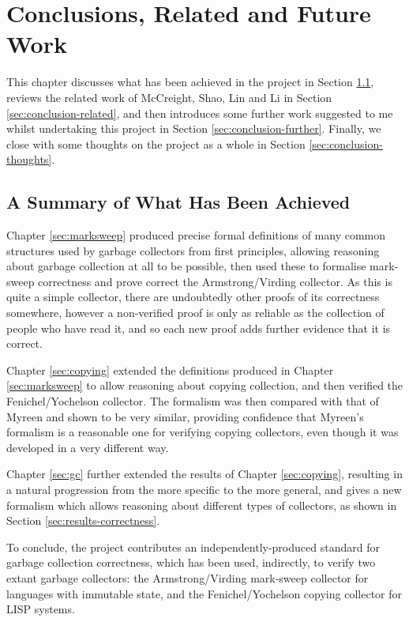 \chapter{Conclusions, Related and Future Work}
\label{sec:conclusion}

This chapter discusses what has been achieved in the project in
Section \ref{sec:conclusion-review}, reviews the related work of
McCreight, Shao, Lin and Li\cite{McCreight07} in Section
\ref{sec:conclusion-related}, and then introduces some further work
suggested to me whilst undertaking this project in Section
\ref{sec:conclusion-further}. Finally, we close with some thoughts on
the project as a whole in Section \ref{sec:conclusion-thoughts}.

\section{A Summary of What Has Been Achieved}
\label{sec:conclusion-review}

Chapter \ref{sec:marksweep} produced precise formal definitions of
many common structures used by garbage collectors from first
principles, allowing reasoning about garbage collection at all to be
possible, then used these to formalise mark-sweep correctness and
prove correct the Armstrong/Virding collector. As this is quite a
simple collector, there are undoubtedly other proofs of its
correctness somewhere, however a non-verified proof is only as
reliable as the collection of people who have read it, and so each new
proof adds further evidence that it is correct.

Chapter \ref{sec:copying} extended the definitions produced in Chapter
\ref{sec:marksweep} to allow reasoning about copying collection, and
then verified the Fenichel/Yochelson collector. The formalism was then
compared with that of Myreen\cite{Myreen10} and shown to be very
similar, providing confidence that Myreen's formalism is a reasonable
one for verifying copying collectors, even though it was developed in
a very different way.

Chapter \ref{sec:gc} further extended the results of Chapter
\ref{sec:copying}, resulting in a natural progression from the more
specific to the more general, and gives a new formalism which allows
reasoning about different types of collectors, as shown in Section
\ref{sec:results-correctness}.

To conclude, the project contributes an independently-produced
standard for garbage collection correctness, which has been used,
indirectly, to verify two extant garbage collectors: the
Armstrong/Virding mark-sweep collector for languages with immutable
state, and the Fenichel/Yochelson copying collector for LISP systems.

